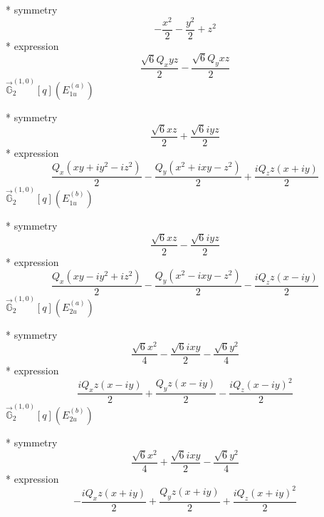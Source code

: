 \documentclass[fleqn,8pt]{jsarticle}
\begin{document}
\noindent\quad ** symmetry
\begin{dmath*}
- \frac{x^{2}}{2} - \frac{y^{2}}{2} + z^{2}
\end{dmath*}
\noindent\quad ** expression
\begin{dmath*}
\frac{\sqrt{6} Q_{x} y z}{2} - \frac{\sqrt{6} Q_{y} x z}{2}
\end{dmath*}
\noindent\quad $\vec{\mathbb{G}}_{2}^{(1,0)}[q](E_{1u}^{(a)})$

\noindent\quad ** symmetry
\begin{dmath*}
\frac{\sqrt{6} x z}{2} + \frac{\sqrt{6} i y z}{2}
\end{dmath*}
\noindent\quad ** expression
\begin{dmath*}
\frac{Q_{x} \left(x y + i y^{2} - i z^{2}\right)}{2} - \frac{Q_{y} \left(x^{2} + i x y - z^{2}\right)}{2} + \frac{i Q_{z} z \left(x + i y\right)}{2}
\end{dmath*}
\noindent\quad $\vec{\mathbb{G}}_{2}^{(1,0)}[q](E_{1u}^{(b)})$

\noindent\quad ** symmetry
\begin{dmath*}
\frac{\sqrt{6} x z}{2} - \frac{\sqrt{6} i y z}{2}
\end{dmath*}
\noindent\quad ** expression
\begin{dmath*}
\frac{Q_{x} \left(x y - i y^{2} + i z^{2}\right)}{2} - \frac{Q_{y} \left(x^{2} - i x y - z^{2}\right)}{2} - \frac{i Q_{z} z \left(x - i y\right)}{2}
\end{dmath*}
\noindent\quad $\vec{\mathbb{G}}_{2}^{(1,0)}[q](E_{2u}^{(a)})$

\noindent\quad ** symmetry
\begin{dmath*}
\frac{\sqrt{6} x^{2}}{4} - \frac{\sqrt{6} i x y}{2} - \frac{\sqrt{6} y^{2}}{4}
\end{dmath*}
\noindent\quad ** expression
\begin{dmath*}
\frac{i Q_{x} z \left(x - i y\right)}{2} + \frac{Q_{y} z \left(x - i y\right)}{2} - \frac{i Q_{z} \left(x - i y\right)^{2}}{2}
\end{dmath*}
\noindent\quad $\vec{\mathbb{G}}_{2}^{(1,0)}[q](E_{2u}^{(b)})$

\noindent\quad ** symmetry
\begin{dmath*}
\frac{\sqrt{6} x^{2}}{4} + \frac{\sqrt{6} i x y}{2} - \frac{\sqrt{6} y^{2}}{4}
\end{dmath*}
\noindent\quad ** expression
\begin{dmath*}
- \frac{i Q_{x} z \left(x + i y\right)}{2} + \frac{Q_{y} z \left(x + i y\right)}{2} + \frac{i Q_{z} \left(x + i y\right)^{2}}{2}
\end{dmath*}
\end{document}
